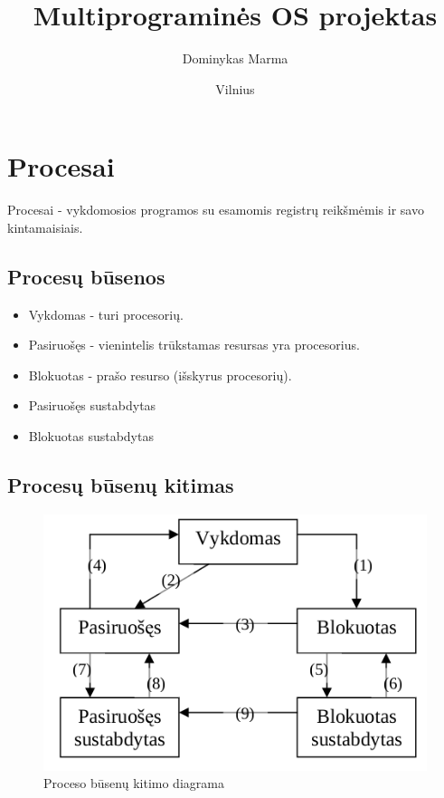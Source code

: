 \documentclass{VUMIFInfKursinis}
\institute{Informatikos institutas}  %
\title{Multiprograminės OS projektas}
\author{Dominykas Marma}
\date{Vilnius \\ \the\year}
\begin{document}
\maketitle

\tableofcontents

\section{Procesai}

Procesai - vykdomosios programos su esamomis registrų reikšmėmis ir savo kintamaisiais.

\subsection{Procesų būsenos}

\begin{itemize}
	\item Vykdomas - turi procesorių.
	\item Pasiruošęs - vienintelis trūkstamas resursas yra procesorius.
	\item Blokuotas - prašo resurso (išskyrus procesorių).
	\item Pasiruošęs sustabdytas
	\item Blokuotas sustabdytas
\end{itemize}

\subsection{Procesų būsenų kitimas}

\begin{figure}[H]
	\centering	
	\includegraphics[scale=0.6]{img/busenu-kitimas}
	\caption{Proceso būsenų kitimo diagrama}   %
	\label{img:busenu-kitimas}
\end{figure}
\end{document}
